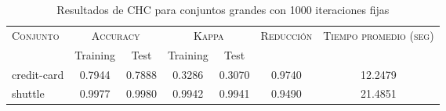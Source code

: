 \begin{table}[]
\centering
\begin{tabular}{l c c c c c c}
\hline
\multirow{2}{*}{\textsc{Conjunto}}
	& \multicolumn{2}{c}{\textsc{Accuracy}}
	& \multicolumn{2}{c}{\textsc{Kappa}}
	& \textsc{Reducción}
	& \textsc{Tiempo promedio (seg)} \\
	& Training & Test
	& Training & Test \\ 
\hline
\hline

credit-card & 0.7944 & 0.7888 & 0.3286 & 0.3070 & 0.9740 & 12.2479 \\
shuttle & 0.9977 & 0.9980 & 0.9942 & 0.9941 & 0.9490 & 21.4851 \\

\hline
\end{tabular}
\caption{Resultados de CHC para conjuntos grandes con 1000 iteraciones fijas}
\label{res-grande-chc}
\end{table}

